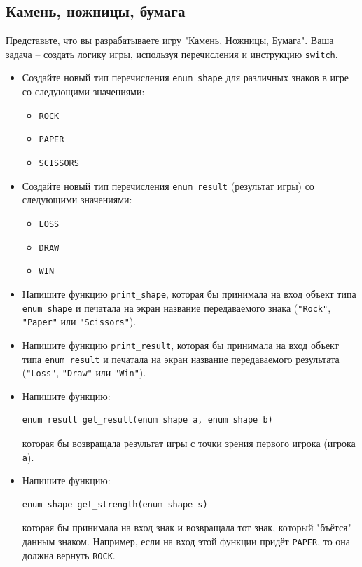 \documentclass[10pt]{article}
\begin{document}
\subsection{Камень, ножницы, бумага}
Представьте, что вы разрабатываете игру "Камень, Ножницы, Бумага"{}. Ваша задача -- создать логику игры, используя перечисления и инструкцию \texttt{switch}.
\begin{itemize}
\item Создайте новый тип перечисления \texttt{enum shape} для различных знаков в игре со следующими значениями:
\begin{itemize}
\item \texttt{ROCK}
\item \texttt{PAPER}
\item \texttt{SCISSORS}
\end{itemize}

\item Создайте новый тип перечисления \texttt{enum result} (результат игры) со следующими значениями:
\begin{itemize}
\item \texttt{LOSS}
\item \texttt{DRAW}
\item \texttt{WIN}
\end{itemize}

\item Напишите функцию \texttt{print\_shape}, которая бы принимала на вход объект типа \texttt{enum shape} и печатала на экран название передаваемого знака (\texttt{"Rock"{}}, \texttt{"Paper"{}} или \texttt{"Scissors"{}}).
\item Напишите функцию \texttt{print\_result}, которая бы принимала на вход объект типа \texttt{enum result} и печатала на экран название передаваемого результата (\texttt{"Loss"{}}, \texttt{"Draw"{}} или \texttt{"Win"{}}).
\item Напишите функцию:
\begin{lstlisting}
enum result get_result(enum shape a, enum shape b)
\end{lstlisting}
которая бы возвращала результат игры с точки зрения первого игрока (игрока \texttt{a}).

\item Напишите функцию:
\begin{lstlisting}
enum shape get_strength(enum shape s)
\end{lstlisting}
которая бы принимала на вход знак и возвращала тот знак, который "бъётся"{} данным знаком. Например, если на вход этой функции придёт \texttt{PAPER}, то она должна вернуть \texttt{ROCK}.

\end{itemize}
\end{document}
